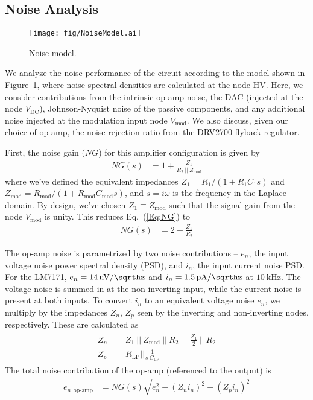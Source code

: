 \documentclass[aip,rsi,reprint]{revtex4-1} %
\newcommand{\epar}{~||~} %
\begin{document}
\subsection{Noise Analysis}
\label{Sec:NoiseAnalysis}

\begin{figure}[t]
\texttt{[image: fig/NoiseModel.ai]}
\caption{Noise model. \label{Fig:NoiseModel}}
\end{figure}

We analyze the noise performance of the circuit according to the model shown in Figure~\ref{Fig:NoiseModel}, where noise spectral densities are calculated at the node HV.
Here, we consider contributions from the intrinsic op-amp noise, the DAC (injected at the node $V_{\text{DC}}$), Johnson-Nyquist noise of the passive components, and any additional noise injected at the modulation input node $V_{\text{mod}}$.
We also discuss, given our choice of op-amp, the noise rejection ratio from the DRV2700 flyback regulator.

First, the noise gain ($NG$) for this amplifier configuration is given by
\begin{align}
\label{Eq:NG}
NG(s) &= 1 + \frac{Z_1}{R_2 \epar Z_{\text{mod}}}
\end{align}
where we've defined the equivalent impedances $Z_1 = R_1/(1+R_1 C_1 s)$ and $Z_{\text{mod}} = R_{\text{mod}}/(1+R_{\text{mod}} C_{\text{mod}} s)$, and $s = i\omega$ is the frequency in the Laplace domain.
By design, we've chosen $Z_1 \equiv Z_{\text{mod}}$ such that the signal gain from the node $V_{\text{mod}}$ is unity.
This reduces Eq.~(\ref{Eq:NG}) to
\begin{align}
\label{Eq:RedNG}
NG(s) &= 2 + \frac{Z_1}{R_2}
\end{align}

The op-amp noise is parametrized by two noise contributions -- $e_n$, the input voltage noise power spectral density (PSD), and $i_n$, the input current noise PSD. 
For the LM7171, $e_n = \SI[per-mode=symbol]{14}{\nano\volt\per\sqrthz}$ and $i_n = \SI[per-mode=symbol]{1.5}{\pico\ampere\per\sqrthz}$ at $\SI{10}{\kilo\hertz}$.
The voltage noise is summed in at the non-inverting input, while the current noise is present at both inputs.
To convert $i_n$ to an equivalent voltage noise $e_n$, we multiply by the impedances $Z_n$, $Z_p$ seen by the inverting and non-inverting nodes, respectively.
These are calculated as
\begin{align}
\begin{split}
\label{Eq:ZnZp}
Z_n &= Z_1 \epar Z_{\text{mod}} \epar  R_2   = \frac{Z_1}{2} \epar R_2 \\
Z_p &= R_{\text{LP}}  \big|\big|\frac{1}{s~C_{\text{LP}}}
\end{split}
\end{align}
The total noise contribution of the op-amp (referenced to the output) is
\begin{align}
\label{Eq:OpAmpNoise}
e_{n,\text{op-amp}} &= NG(s)\sqrt{e_n^2 + (Z_n i_n)^2 + (Z_p i_n)^2}
\end{align}
\end{document}
